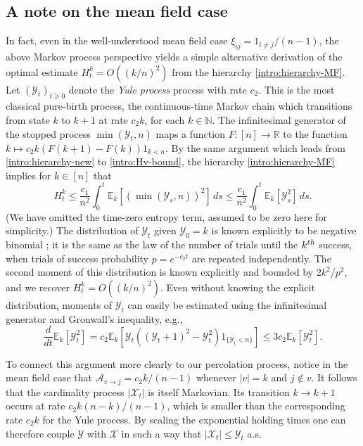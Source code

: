 \documentclass[11pt,reqno]{amsart}
\numberwithin{equation}{section}
\theoremstyle{definition}
\def\A{{\mathcal A}}
\def\E{{\mathbb E}}
\def\N{{\mathbb N}}
\def\R{{\mathbb R}}
\def\X{{\mathcal X}}
\def\Y{{\mathcal Y}}
\begin{document}
\subsection{A note on the mean field case}
In fact, even in the well-understood mean field case $\xi_{ij}=1_{i \neq j}/(n-1)$, the above Markov process  perspective yields a simple alternative derivation of the optimal estimate $H^k_t = O((k/n)^2)$ from the hierarchy \eqref{intro:hierarchy-MF}.
Let $(\mathcal{Y}_t)_{t \ge 0}$ denote the \emph{Yule  process} process with rate $c_2$. This is the most classical pure-birth process, the continuous-time Markov chain which transitions from state $k$ to $k+1$ at rate $c_2k$, for each $k \in \N$. The infinitesimal generator  of the stopped process $\min(\Y_t,n)$ maps a function $F:[n] \to \R$ to the function $k \mapsto c_2 k(F(k+1)-F(k))1_{k < n}$. By the same  argument which leads from \eqref{intro:hierarchy-new} to \eqref{intro:Hv-bound}, the hierarchy \eqref{intro:hierarchy-MF} implies for $k \in [n]$ that
\begin{equation}
H^k_t \le \frac{c_1}{n^2} \int_0^t \E_k[(\min(\mathcal{Y}_s,n))^2]\,ds \le \frac{c_1}{n^2} \int_0^t \E_k[ \mathcal{Y}_s^2]\,ds. \label{intro:Hv-Yulebound}
\end{equation}
(We have omitted the time-zero entropy term, assumed to be zero here for simplicity.)
The distribution of $\mathcal{Y}_t$ given $\mathcal{Y}_0=k$ is known explicitly to be negative binomial \cite[Example 6.8]{ross2014introduction}; it is the same as the law of the number of trials until the $k^{\rm th}$ success, when trials of success probability $p=e^{-c_2t}$ are repeated independently. The second moment of this distribution is known explicitly and bounded by $2k^2/p^2$, and we recover $H^k_t = O((k/n)^2)$.
Even without knowing the explicit distribution, moments of $\Y_t$ can easily be estimated using the infinitesimal generator and Gronwall's inequality, e.g.,
\[
\frac{d}{dt}\E_k[\mathcal{Y}_t^2] = c_2\E_k[\mathcal{Y}_t((\mathcal{Y}_t+1)^2-\mathcal{Y}_t^2)1_{\{\Y_t < n\}}] \le 3c_2\E_k[ \mathcal{Y}_t^2 ].
\]


To connect this argument more clearly to our percolation process, notice in the mean field case that $\A_{v \to j} = c_2k/(n-1)$ whenever $|v|=k$ and $j \notin v$.
It follows that the cardinality process $|\X_t|$ is itself Markovian. 
Its transition $k\to k+1$ occurs at rate $c_2k(n-k)/(n-1)$, which is smaller than the corresponding rate $c_2 k$ for the Yule process. 
By scaling the exponential holding times one can therefore couple $\mathcal{Y}$ with $\X$ in such a way that $|\X_t| \le \mathcal{Y}_t$ a.s. 
\end{document}
